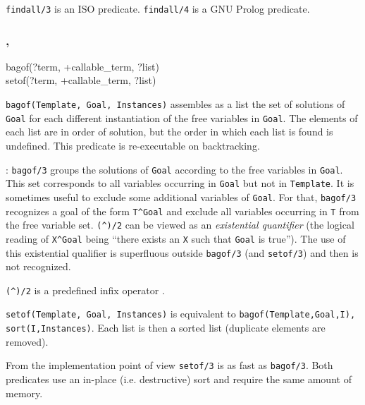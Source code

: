 \Portability

\texttt{findall/3} is an ISO predicate. \texttt{findall/4} is a GNU Prolog predicate.

\subsubsection{,
               }

\begin{TemplatesOneCol}
bagof(?term, +callable\_term, ?list)\\
setof(?term, +callable\_term, ?list)

\end{TemplatesOneCol}

\Description

\texttt{bagof(Template, Goal, Instances)} assembles as a list the
set of solutions of \texttt{Goal} for each different instantiation of the
free variables in \texttt{Goal}. The elements of each list are in order of
solution, but the order in which each list is found is undefined.
This predicate is re-executable on backtracking.

: \texttt{bagof/3} groups the solutions of
\texttt{Goal} according to the free variables in \texttt{Goal}. This set
corresponds to all variables occurring in \texttt{Goal} but not in
\texttt{Template}. It is sometimes useful to exclude some additional
variables of \texttt{Goal}. For that, \texttt{bagof/3} recognizes a goal of
the form \texttt{T\^{}Goal} and exclude all variables occurring in \texttt{T}
from the free variable set. \texttt{(\^{})/2} can be viewed as an
\emph{existential quantifier} (the logical reading of \texttt{X\^{}Goal}
being ``there exists an \texttt{X} such that \texttt{Goal} is true''). The
use of this existential qualifier is superfluous outside \texttt{bagof/3}
(and \texttt{setof/3}) and then is not recognized.

\texttt{(\^{})/2} is a predefined infix operator .

\texttt{setof(Template, Goal, Instances)} is equivalent to
\texttt{bagof(Template,Goal,I), sort(I,Instances)}. Each list is then a
sorted list (duplicate elements are removed).

From the implementation point of view \texttt{setof/3} is as fast as
\texttt{bagof/3}. Both predicates use an in-place (i.e. destructive) sort
 and require the same amount of memory.

